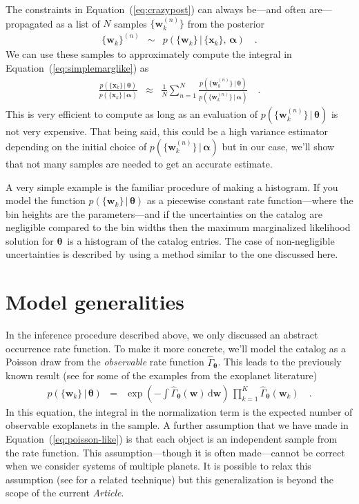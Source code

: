 \documentclass[12pt,preprint]{aastex}
\newcommand{\paper}{\textsl{Article}}
\newcommand{\Eq}[1]{Equation~(\ref{eq:#1})}
\newcommand{\eq}[1]{\Eq{#1}}
\newcommand{\eqlabel}[1]{\label{eq:#1}}
\newcommand{\sectlabel}[1]{\label{sect:#1}}
\newcommand{\dd}{\ensuremath{\,\mathrm{d}}}
\newcommand{\bvec}[1]{\ensuremath{\boldsymbol{#1}}}
\newcommand{\rate}{\ensuremath{\Gamma}}
\newcommand{\ratepar}{{\ensuremath{\theta}}}
\newcommand{\ratepars}{{\ensuremath{\bvec{\ratepar}}}}
\newcommand{\obs}[1]{\ensuremath{\hat{#1}}}
\newcommand{\data}{{\ensuremath{\bvec{x}}}}
\newcommand{\entry}{{\ensuremath{\bvec{w}}}}
\newcommand{\interim}{{\ensuremath{\bvec{\alpha}}}}
\begin{document}
The constraints in \eq{crazypost} can always be---and often are---propagated
as a list of $N$ samples $\{\entry_k^{(n)}\}$ from the posterior
\begin{eqnarray}
\{\entry_k\}^{(n)} &\sim& p(\{\entry_k\}\,|\,\{\data_k\},\,\interim) \quad.
\end{eqnarray}
We can use these samples to approximately compute the integral in
\eq{simplemarglike} as
\begin{eqnarray}\eqlabel{importance}
\frac{p(\{\data_k\}\,|\,\ratepars)}{p(\{\data_k\}\,|\,\interim)} &\approx&
    \frac{1}{N} \sum_{n=1}^N
    \frac{p(\{\entry_k^{(n)}\}\,|\,\ratepars)}
         {p(\{\entry_k^{(n)}\}\,|\,\interim)} \quad.
\end{eqnarray}
This is very efficient to compute as long as an evaluation of
$p(\{\entry_k^{(n)}\}\,|\,\ratepars)$ is not very expensive.
That being said, this could be a high variance estimator depending on the
initial choice of $p(\{\entry_k^{(n)}\}\,|\,\interim)$ but in our case, we'll
show that not many samples are needed to get an accurate estimate.

A very simple example is the familiar procedure of making a histogram.
If you model the function $p(\{\entry_k\}\,|\,\ratepars)$ as a piecewise
constant rate function---where the bin heights are the parameters---and if the
uncertainties on the catalog are negligible compared to the bin widths then
the maximum marginalized likelihood solution for \ratepars\ is a histogram of
the catalog entries.
The case of non-negligible uncertainties is described by \citet{hogge} using a
method similar to the one discussed here.

\section{Model generalities}
\sectlabel{model}

In the inference procedure described above, we only discussed an abstract
occurrence rate function.
To make it more concrete, we'll model the catalog as a Poisson draw from the
\emph{observable} rate function $\obs{\rate}_\ratepars$.
This leads to the previously known result (see \citealt{tabachnik,youdin} for
some of the examples from the exoplanet literature)
\begin{eqnarray}\eqlabel{poisson-like}
p(\{\entry_k\}\,|\,\ratepars) &=&
    \exp\left(-\int \obs{\rate}_\ratepars (\entry) \dd\entry\right) \,
    \prod_{k=1}^K \obs{\rate}_\ratepars (\entry_k)\quad.
\end{eqnarray}
In this equation, the integral in the normalization term is the expected
number of observable exoplanets in the sample.
A further assumption that we have made in \eq{poisson-like} is that each
object is an independent sample from the rate function.
This assumption---though it is often made---cannot be correct when we consider
systems of multiple planets.
It is possible to relax this assumption (see \citealt{tremaine} for a related
technique) but this generalization is beyond the scope of the current \paper.
\end{document}
